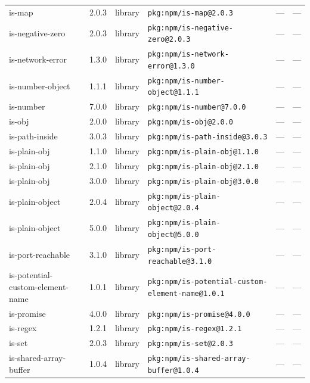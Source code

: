 \documentclass[11pt,a4paper]{article}
\begin{document}
\begin{longtable}{|p{4cm}|p{2cm}|p{1.6cm}|p{5cm}|p{1.5cm}|p{3.5cm}|}
\raggedright is-map & 2.0.3 & library & \small\texttt{pkg:npm/is-map@2.0.3} & — & \small — \\
\raggedright is-negative-zero & 2.0.3 & library & \small\texttt{pkg:npm/is-negative-zero@2.0.3} & — & \small — \\
\raggedright is-network-error & 1.3.0 & library & \small\texttt{pkg:npm/is-network-error@1.3.0} & — & \small — \\
\raggedright is-number-object & 1.1.1 & library & \small\texttt{pkg:npm/is-number-object@1.1.1} & — & \small — \\
\raggedright is-number & 7.0.0 & library & \small\texttt{pkg:npm/is-number@7.0.0} & — & \small — \\
\raggedright is-obj & 2.0.0 & library & \small\texttt{pkg:npm/is-obj@2.0.0} & — & \small — \\
\raggedright is-path-inside & 3.0.3 & library & \small\texttt{pkg:npm/is-path-inside@3.0.3} & — & \small — \\
\raggedright is-plain-obj & 1.1.0 & library & \small\texttt{pkg:npm/is-plain-obj@1.1.0} & — & \small — \\
\raggedright is-plain-obj & 2.1.0 & library & \small\texttt{pkg:npm/is-plain-obj@2.1.0} & — & \small — \\
\raggedright is-plain-obj & 3.0.0 & library & \small\texttt{pkg:npm/is-plain-obj@3.0.0} & — & \small — \\
\raggedright is-plain-object & 2.0.4 & library & \small\texttt{pkg:npm/is-plain-object@2.0.4} & — & \small — \\
\raggedright is-plain-object & 5.0.0 & library & \small\texttt{pkg:npm/is-plain-object@5.0.0} & — & \small — \\
\raggedright is-port-reachable & 3.1.0 & library & \small\texttt{pkg:npm/is-port-reachable@3.1.0} & — & \small — \\
\raggedright is-potential-custom-element-name & 1.0.1 & library & \small\texttt{pkg:npm/is-potential-custom-element-name@1.0.1} & — & \small — \\
\raggedright is-promise & 4.0.0 & library & \small\texttt{pkg:npm/is-promise@4.0.0} & — & \small — \\
\raggedright is-regex & 1.2.1 & library & \small\texttt{pkg:npm/is-regex@1.2.1} & — & \small — \\
\raggedright is-set & 2.0.3 & library & \small\texttt{pkg:npm/is-set@2.0.3} & — & \small — \\
\raggedright is-shared-array-buffer & 1.0.4 & library & \small\texttt{pkg:npm/is-shared-array-buffer@1.0.4} & — & \small — \\

\end{longtable}
\end{document}
